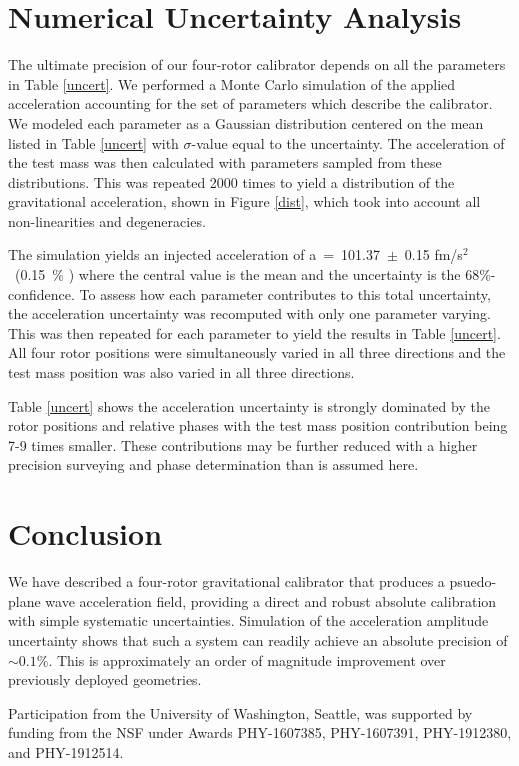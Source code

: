 \documentclass[superscriptaddress, twocolumn, prd]{revtex4-1}
\begin{document}
\section{Numerical Uncertainty Analysis}

The ultimate precision of our four-rotor calibrator depends on all the parameters in Table \ref{uncert}. We performed a Monte Carlo simulation of the applied acceleration accounting for the set of parameters which describe the calibrator. We modeled each parameter as a Gaussian distribution centered on the mean listed in Table \ref{uncert} with $\sigma$-value equal to the uncertainty. The acceleration of the test mass was then calculated with parameters sampled from these distributions. This was repeated 2000 times to yield a distribution of the gravitational acceleration, shown in Figure \ref{dist}, which took into account all non-linearities and degeneracies. 


The simulation yields an injected acceleration of a~=~101.37~$\pm$~0.15 fm/s$^2$~(0.15~\% ) where the central value is the mean and the uncertainty is the 68\%-confidence. To assess how each parameter contributes to this total uncertainty, the acceleration uncertainty was recomputed with only one parameter varying. This was then repeated for each parameter to yield the results in Table \ref{uncert}. All four rotor positions were simultaneously varied  in all three directions and the test mass position was also varied in all three directions.

Table \ref{uncert} shows the acceleration uncertainty is strongly dominated by the rotor positions and relative phases with the test mass position contribution being 7-9 times smaller. These contributions may be further reduced with a higher precision surveying and phase determination than is assumed here.
\\
\section{Conclusion} 
\quad We have described a four-rotor gravitational calibrator that produces a psuedo-plane wave acceleration field, providing a direct and robust absolute calibration with simple systematic uncertainties. Simulation of the acceleration amplitude uncertainty shows that such a system can readily achieve an absolute precision of $\sim0.1\%$. This is approximately an order of magnitude improvement over previously deployed geometries. \cite{ncal} 

\begin{acknowledgements}

Participation from the University of Washington, Seattle, was supported by funding from the NSF under Awards PHY-1607385, PHY-1607391, PHY-1912380, and PHY-1912514.

\end{acknowledgements}


 

\end{document}
